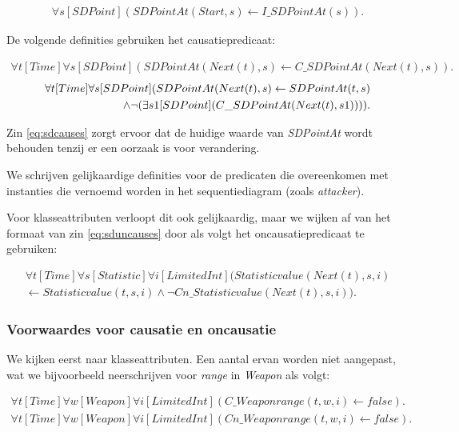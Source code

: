 \begin{align}
	\forall{s}[SDPoint](SDPointAt(Start, s) \leftarrow I\_SDPointAt(s)).
\end{align}


De volgende definities gebruiken het causatiepredicaat:

\begin{align}
	\forall{t}[Time]\forall{s}[SDPoint](SDPointAt(Next(t), s) \leftarrow C\_SDPointAt(Next(t), s)). \label{eq:sdcauses}
\end{align}
\begin{align}
	\forall{t}[Time]\forall{s}[SDPoint](SDPointAt(Next(t), s) \leftarrow SDPointAt(t, s) \nonumber \\ \land{} \space \lnot{}(\exists{s1}[SDPoint](C\_SDPointAt(Next(t), s1)))). \label{eq:sduncauses}
\end{align}

Zin \ref{eq:sdcauses} zorgt ervoor dat de huidige waarde van \textit{SDPointAt} wordt behouden tenzij er een oorzaak is voor verandering.

We schrijven gelijkaardige definities voor de predicaten die overeenkomen met instanties die vernoemd worden in het sequentiediagram (zoals \textit{attacker}).

\parbreak

Voor klasseattributen verloopt dit ook gelijkaardig, maar we wijken af van het formaat van zin \ref{eq:sduncauses} door als volgt het oncausatiepredicaat te gebruiken:

\begin{align*}
	\forall{t}[Time]\forall{s}[Statistic]\forall{i}[LimitedInt](Statisticvalue(Next(t), s, i) \\ \leftarrow Statisticvalue(t, s, i) \land \lnot Cn\_Statisticvalue(Next(t), s, i)).
\end{align*}

\subsubsection{Voorwaardes voor causatie en oncausatie}
We kijken eerst naar klasseattributen. Een aantal ervan worden niet aangepast, wat we bijvoorbeeld neerschrijven voor \textit{range} in \textit{Weapon} als volgt:

\begin{align*}
	\forall{t}[Time]\forall{w}[Weapon]\forall{i}[LimitedInt](C\_Weaponrange(t, w, i) \leftarrow false).
\end{align*}
\begin{align*}
	\forall{t}[Time]\forall{w}[Weapon]\forall{i}[LimitedInt](Cn\_Weaponrange(t, w, i) \leftarrow false).
\end{align*}

